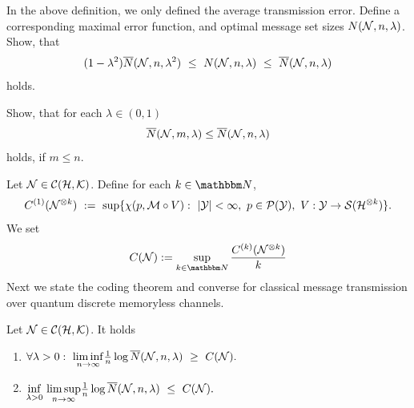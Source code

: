      \begin{exercise} 
      In the above definition, we only defined the average transmission error. Define a corresponding maximal error function, and optimal message set sizes $N({\mathcal N},n, \lambda)$. Show, that 
      \begin{align*}
        (1 - \lambda^2) \overline{N}({\mathcal N}, n, \lambda^2) \ \leq \ N({\mathcal N}, n, \lambda) \ \leq \ \overline{N}({\mathcal N}, n, \lambda)
      \end{align*}
      holds.
     \end{exercise}
     \begin{exercise} \label{ex:message_set_monotonicity}
      Show, that for each $\lambda \in (0,1)$
      \begin{align*}
       \overline{N}({\mathcal N}, m, \lambda) \leq \overline{N}({\mathcal N}, n, \lambda)
      \end{align*}
      holds, if $m \leq n$.
     \end{exercise}
      Let ${\mathcal N} \in {\mathcal C}({\mathcal H},{\mathcal K})$. Define for each $k \in \bbmN$, 
		\begin{align} 
		C^{(1)}(\cN^{\otimes k}) \ := \ \sup \{\chi(p, \cM \circ V): \ |\cY| < \infty, \ p \in \cP(\cY), \ V: \cY \rightarrow \cS(\cH^{\otimes k}) \} \label{thm:dmqc_channel_coding_one_shot}.
	\end{align}
		We set 
		\begin{align}
		 C(\cN) := \sup_{k \in \bbmN} \frac{C^{(k)}(\cN^{\otimes k})}{k} \label{def:holevo_information_quantum}
		\end{align}
	Next we state the coding theorem and converse for classical message transmission over quantum discrete memoryless channels. 
    \begin{theorem} \label{thm:dmqc_channel_coding}
    	Let ${\mathcal N} \in {\mathcal C}({\mathcal H},{\mathcal K})$. It holds
      \begin{enumerate}
       \item \label{thm:dmqc_channel_coding_1}
        $
        \forall \lambda > 0: \ \underset{n \rightarrow \infty}{\liminf} \frac{1}{n} \log \overline{N}(\cN, n, \lambda) \ \geq \ C(\cN). 
       $
       \item  \label{thm:dmqc_channel_coding_2}
		$
        \underset{\lambda > 0}{\inf} \ \underset{n \rightarrow \infty}{\limsup} \frac{1}{n} \log \overline{N}({\mathcal N}, n, \lambda) \ \leq \  C({\mathcal N}).
       $
       \end{enumerate}
     \end{theorem}
